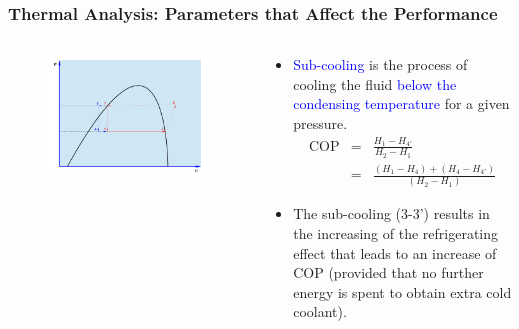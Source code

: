 \documentclass[10pt,compress]{beamer}
\newcommand{\frc}{\displaystyle\frac}
\begin{document}
\begin{frame}
 \frametitle{Thermal Analysis: Parameters that Affect the Performance}
 \begin{columns}
  \begin{column}[c]{0.3\linewidth}
   \begin{figure}%
      \includegraphics[width=4.cm,height=4.cm,clip]{./Pics/Overview_Refrig23}
   \end{figure}  
  \end{column}  
  \begin{column}[c]{0.7\linewidth}
   \begin{itemize}
    \item <1-> \textcolor{blue}{Sub-cooling} is the process of cooling the fluid \textcolor{blue}{below the condensing temperature} for a given pressure.
     \begin{eqnarray}
      \text{COP}&=&\frc{H_{1}-H_{4'}}{H_{2}-H_{1}} \nonumber \\
                                  &=& \frc{\left(H_{1}-H_{4}\right)+\left(H_{4}-H_{4'}\right)}{\left(H_{2}-H_{1}\right)} \nonumber 
     \end{eqnarray} 
    \item <2-> The sub-cooling (3-3') results in the increasing of the refrigerating effect that leads to an increase of COP (provided that no further energy is spent to obtain extra cold coolant).
   \end{itemize}
  \end{column}  
 \end{columns}
\end{frame}
\end{document}
